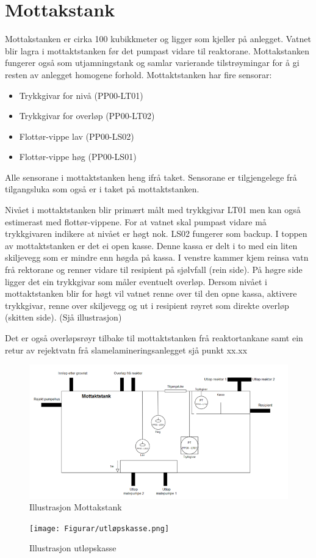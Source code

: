 \newpage
\section{Mottakstank}
Mottakstanken er cirka 100 kubikkmeter og ligger som kjeller på anlegget. Vatnet blir lagra i mottaktstanken før det pumpast vidare til reaktorane. 
Mottakstanken fungerer også som utjamningstank og samlar varierande tilstrøymingar for å gi resten av anlegget homogene forhold.
Mottaktstanken har fire sensorar:
\begin{itemize}
    \item Trykkgivar for nivå (PP00-LT01) 
    \item Trykkgivar for overløp (PP00-LT02) 
    \item Flottør-vippe lav (PP00-LS02) 
    \item Flottør-vippe høg (PP00-LS01) 
\end{itemize}
Alle sensorane i mottaktstanken heng ifrå taket. Sensorane er tilgjengelege frå tilgangsluka som også er i taket på mottaktstanken.

Nivået i mottaktstanken blir primært målt med trykkgivar LT01 men kan også estimerast med flottør-vippene. For at vatnet skal pumpast vidare må trykkgivaren indikere at nivået er høgt nok. 
LS02 fungerer som backup.
I toppen av mottaktstanken er det ei open kasse. Denne kassa er delt i to med ein liten skiljevegg som er mindre enn høgda på kassa. I venstre kammer kjem reinsa vatn frå rektorane og renner vidare til resipient på sjølvfall (rein side). 
På høgre side ligger det ein trykkgivar som måler eventuelt overløp. Dersom nivået i mottaktstanken blir for høgt vil vatnet renne over til den opne kassa, 
aktivere trykkgivar, renne over skiljevegg og ut i resipient røyret som direkte overløp (skitten side). (Sjå illustrasjon)

Det er også overløpsrøyr tilbake til mottaktstanken frå reaktortankane samt ein retur av rejektvatn frå slamelamineringsanlegget sjå punkt xx.xx

\newpage
\begin{figure}[htbp]
    \centering
    \includegraphics[width=1\textwidth]{Figurar/Mottakstank.png}
    \caption{Illustrasjon Mottakstank}\label{fig:Mottakstank}
\end{figure}

\begin{figure}[htbp]
    \centering
    \texttt{[image: Figurar/utløpskasse.png]}
    \caption{Illustrasjon utløpskasse}\label{fig:utløpskasse}
\end{figure}

